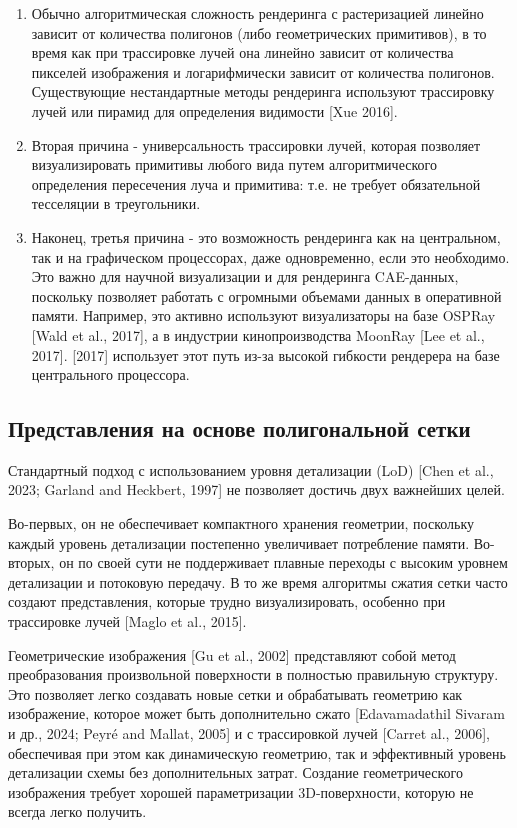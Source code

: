 \documentclass[a4paper,hidelinks,12pt]{article}
\begin{document}
\begin{enumerate}
	\item Обычно алгоритмическая сложность рендеринга с растеризацией линейно зависит от количества 
	полигонов (либо геометрических примитивов), в то время как при трассировке лучей она линейно зависит 
	от количества пикселей изображения и логарифмически зависит от количества полигонов. Существующие 
	нестандартные методы рендеринга используют трассировку лучей или пирамид для определения видимости [Xue 2016].
	\item Вторая причина - универсальность трассировки лучей, которая позволяет визуализировать примитивы любого 
	вида путем алгоритмического определения пересечения луча и примитива: т.е. не требует обязательной тесселяции в 
	треугольники.
	\item Наконец, третья причина - это возможность рендеринга как на центральном, так и 
	на графическом процессорах, даже одновременно, если это необходимо. Это важно для научной 
	визуализации и для рендеринга CAE-данных, поскольку позволяет работать с огромными объемами данных 
	в оперативной памяти. Например, это активно используют визуализаторы на базе OSPRay [Wald et al., 2017], 
	а в индустрии кинопроизводства MoonRay [Lee et al., 2017]. [2017] использует этот путь из-за высокой гибкости 
	рендерера на базе центрального процессора.
\end{enumerate}

\newpage

\subsection{Представления на основе полигональной сетки}

Стандартный подход с использованием уровня детализации (LoD) [Chen et al., 2023; Garland and Heckbert, 1997] не позволяет достичь двух важнейших целей. 

Во-первых, он не обеспечивает компактного хранения геометрии, поскольку каждый уровень детализации постепенно увеличивает потребление памяти. Во-вторых, он по своей сути не поддерживает плавные переходы с высоким уровнем детализации и потоковую передачу. В то же время алгоритмы сжатия сетки часто создают представления, которые трудно визуализировать, особенно при трассировке лучей [Maglo et al., 2015]. 

Геометрические изображения [Gu et al., 2002] представляют собой метод преобразования произвольной поверхности в полностью правильную структуру. Это позволяет легко создавать новые сетки и обрабатывать геометрию как изображение, которое может быть дополнительно сжато [Edavamadathil Sivaram и др., 2024; Peyré and Mallat, 2005] и с трассировкой лучей [Carret al., 2006], обеспечивая при этом как динамическую геометрию, так и эффективный уровень детализации схемы без дополнительных затрат. Создание геометрического изображения требует хорошей параметризации 3D-поверхности, которую не всегда легко получить. 
\end{document}

